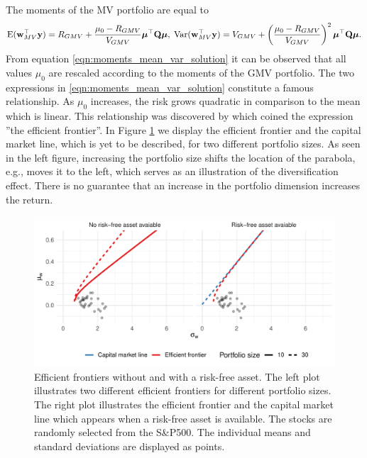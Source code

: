 \documentclass[12pt, oneside]{book}\usepackage{knitr}
\begin{document}
{The moments of the MV portfolio are equal to
\begin{equation}\label{eqn:moments_mean_var_solution}
\operatorname{E}(\mathbf{w}_{MV}^\top\mathbf{y}) = R_{GMV} + \frac{\mu_0 - R_{GMV}}{V_{GMV}} \mbox{\boldmath$\mu$}^\top \mathbf{Q} \mbox{\boldmath$\mu$}, \;
\operatorname{Var}(\mathbf{w}_{MV}^\top\mathbf{y}) =V_{GMV} + \left(\frac{\mu_0 - R_{GMV}}{V_{GMV}}\right)^2 \mbox{\boldmath$\mu$}^\top \mathbf{Q} \mbox{\boldmath$\mu$}.
\end{equation}
From equation \eqref{eqn:moments_mean_var_solution} it can be observed that all values $\mu_0$ are rescaled according to the moments of the GMV portfolio. 
The two expressions in \eqref{eqn:moments_mean_var_solution} constitute a famous relationship. 
As $\mu_0$ increases, the risk grows quadratic in comparison to the mean which is linear. 
This relationship was discovered by \citet{merton1972} which coined the expression ''the efficient frontier''. 
In Figure \ref{fig:mertons_efficient_frontier} we display the efficient frontier and the capital market line, which is yet to be described, for two different portfolio sizes. 
As seen in the left figure, increasing the portfolio size shifts the location of the parabola, e.g., moves it to the left, which serves as an illustration of the diversification effect. 
There is no guarantee that an increase in the portfolio dimension increases the return.
\begin{knitrout}\small
{}\color{fgcolor}\begin{figure}

{\centering \includegraphics[width=\maxwidth]{figure/mertons_efficient_frontier-1} 

}

\caption[Efficient frontiers without and with a risk-free asset]{Efficient frontiers without and with a risk-free asset. The left plot illustrates two different efficient frontiers for different portfolio sizes. The right plot illustrates the efficient frontier and the capital market line which appears when a risk-free asset is available. The stocks are randomly selected from the S\&P500. The individual means and standard deviations are displayed as points.}\label{fig:mertons_efficient_frontier}
\end{figure}


\end{knitrout}}
\end{document}
